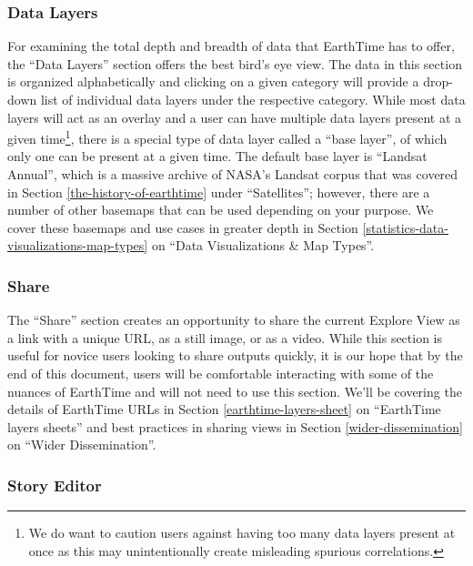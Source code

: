 \documentclass[
  12pt,
]{krantz}
\begin{document}
\hypertarget{data-layers}{%
\subsubsection*{Data Layers}\label{data-layers}}


For examining the total depth and breadth of data that EarthTime has to offer, the ``Data Layers'' section offers the best bird's eye view. The data in this section is organized alphabetically and clicking on a given category will provide a drop-down list of individual data layers under the respective category. While most data layers will act as an overlay and a user can have multiple data layers present at a given time\footnote{We do want to caution users against having too many data layers present at once as this may unintentionally create misleading spurious correlations.}, there is a special type of data layer called a ``base layer'', of which only one can be present at a given time. The default base layer is ``Landsat Annual'', which is a massive archive of NASA's Landsat corpus that was covered in Section \ref{the-history-of-earthtime} under ``Satellites''; however, there are a number of other basemaps that can be used depending on your purpose. We cover these basemaps and use cases in greater depth in Section \ref{statistics-data-visualizations-map-types} on ``Data Visualizations \& Map Types''.

\hypertarget{share}{%
\subsubsection*{Share}\label{share}}


The ``Share'' section creates an opportunity to share the current Explore View as a link with a unique URL, as a still image, or as a video. While this section is useful for novice users looking to share outputs quickly, it is our hope that by the end of this document, users will be comfortable interacting with some of the nuances of EarthTime and will not need to use this section. We'll be covering the details of EarthTime URLs in Section \ref{earthtime-layers-sheet} on ``EarthTime layers sheets'' and best practices in sharing views in Section \ref{wider-dissemination} on ``Wider Dissemination''.

\hypertarget{story-editor}{%
\subsubsection*{Story Editor}\label{story-editor}}
\end{document}
